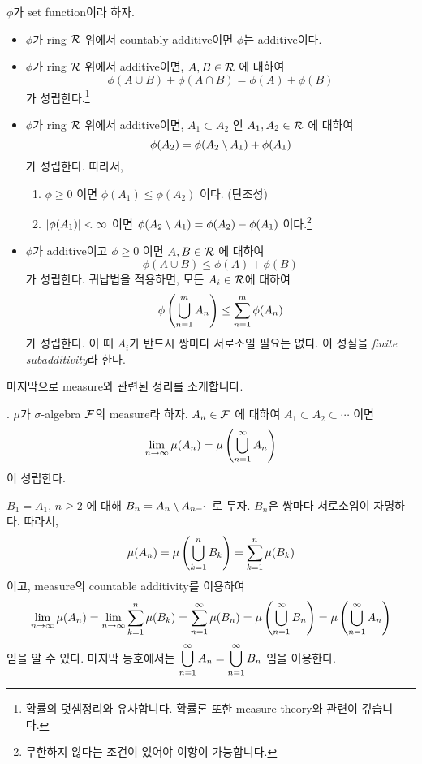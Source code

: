 \(\phi\)가 set function이라 하자.

\begin{itemize}
    \item \(\phi\)가 ring \(\mathcal{R}\) 위에서 countably additive이면 \(\phi\)는 additive이다.

    \item \(\phi\)가 ring \(\mathcal{R}\) 위에서 additive이면, \(A, B \in \mathcal{R}\) 에 대하여
          \[
              \phi(A\cup B) + \phi(A\cap B) = \phi(A) + \phi(B)
          \]
          가 성립한다.\footnote{확률의 덧셈정리와 유사합니다. 확률론 또한 measure theory와 관련이 깊습니다.}

    \item \(\phi\)가 ring \(\mathcal{R}\) 위에서 additive이면, \(A_1 \subset A_2\) 인 \(A_1, A_2 \in \mathcal{R}\) 에 대하여
          \[
              \phi(A_2) = \phi(A_2 \setminus A_1) + \phi(A_1)
          \]
          가 성립한다. 따라서,
          \begin{enumerate}
              \item \(\phi \geq 0\) 이면 \(\phi(A_1) \leq \phi(A_2)\) 이다. (단조성)
              \item \(\left| \phi(A_1) \right| < \infty\) 이면 \(\phi(A_2 \setminus A_1) = \phi(A_2) - \phi(A_1)\) 이다.\footnote{무한하지 않다는 조건이 있어야 이항이 가능합니다.}
          \end{enumerate}

    \item \(\phi\)가 additive이고 \(\phi \geq 0\) 이면 \(A, B \in \mathcal{R}\) 에 대하여
          \[
              \phi(A\cup B) \leq \phi(A) + \phi(B)
          \]
          가 성립한다. 귀납법을 적용하면, 모든 \(A_i \in \mathcal{R}\)에 대하여
          \[
              \phi\left( \bigcup_{n=1}^m A_n \right) \leq \sum_{n=1}^m \phi(A_n)
          \]
          가 성립한다. 이 때 \(A_i\)가 반드시 쌍마다 서로소일 필요는 없다. 이 성질을 \textit{finite subadditivity}라 한다.
\end{itemize}

마지막으로 measure와 관련된 정리를 소개합니다.

\thm. \(\mu\)가 \(\sigma\)-algebra \(\mathcal{F}\)의 measure라 하자. \(A_n \in \mathcal{F}\) 에 대하여 \(A_1 \subset A_2 \subset \cdots\) 이면
\[
    \lim_{n\rightarrow\infty} \mu(A_n) = \mu\left( \bigcup_{n=1}^\infty A_n \right)
\]
이 성립한다.

\pf \(B_1 = A_1\), \(n \geq 2\) 에 대해 \(B_n = A_n \setminus A_{n-1}\) 로 두자. \(B_n\)은 쌍마다 서로소임이 자명하다. 따라서,
\[
    \mu(A_n) = \mu\left( \bigcup_{k=1}^n B_k \right) = \sum_{k=1}^n \mu(B_k)
\]
이고, measure의 countable additivity를 이용하여
\[
    \lim_{n\rightarrow\infty} \mu(A_n) = \lim_{n\rightarrow\infty} \sum_{k=1}^n \mu(B_k) = \sum_{n=1}^\infty \mu(B_n) = \mu\left( \bigcup_{n=1}^{\infty} B_n \right) = \mu\left( \bigcup_{n=1}^\infty A_n \right)
\]
임을 알 수 있다. 마지막 등호에서는 \(\displaystyle \bigcup_{n=1}^\infty A_n = \bigcup_{n=1}^\infty B_n\) 임을 이용한다.

